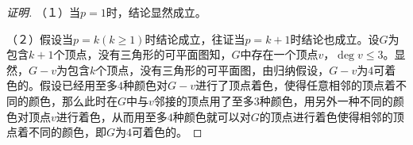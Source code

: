 \documentclass{article}
\begin{document}
\begin{CJK}{UTF8}{gbsn}
\begin{proof}[证明]
    （１）当$p=1$时，结论显然成立。

    （２）假设当$p=k(k\geq 1)$时结论成立，往证当$p=k+1$时结论也成立。设$G$为包含$k+1$个顶点，没有三角形的可平面图知，$G$中存在一个顶点$v$，$\deg v \leq 3$。显然，$G-v$为包含$k$个顶点，没有三角形的可平面图，由归纳假设，$G-v$为$4$可着色的。假设已经用至多$4$种颜色对$G-v$进行了顶点着色，使得任意相邻的顶点着不同的颜色，那么此时在$G$中与$v$邻接的顶点用了至多$3$种颜色，用另外一种不同的颜色对顶点$v$进行着色，从而用至多$4$种颜色就可以对$G$的顶点进行着色使得相邻的顶点着不同的颜色，即$G$为$4$可着色的。
    
  \end{proof}

\end{CJK}
\end{document}
